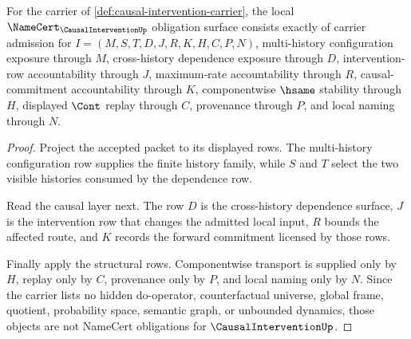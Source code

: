 \begin{theorem}
\label{thm:causal-intervention-namecert-obligations}
For the carrier of \autoref{def:causal-intervention-carrier}, the local $\NameCert_{\CausalInterventionUp}$ obligation surface consists exactly of carrier admission for $I=(M,S,T,D,J,R,K,H,C,P,N)$, multi-history configuration exposure through $M$, cross-history dependence exposure through $D$, intervention-row accountability through $J$, maximum-rate accountability through $R$, causal-commitment accountability through $K$, componentwise $\hsame$ stability through $H$, displayed $\Cont$ replay through $C$, provenance through $P$, and local naming through $N$.
\end{theorem}
\begin{proof}
Project the accepted packet to its displayed rows. The multi-history configuration row supplies the finite history family, while $S$ and $T$ select the two visible histories consumed by the dependence row.

Read the causal layer next. The row $D$ is the cross-history dependence surface, $J$ is the intervention row that changes the admitted local input, $R$ bounds the affected route, and $K$ records the forward commitment licensed by those rows.

Finally apply the structural rows. Componentwise transport is supplied only by $H$, replay only by $C$, provenance only by $P$, and local naming only by $N$. Since the carrier lists no hidden do-operator, counterfactual universe, global frame, quotient, probability space, semantic graph, or unbounded dynamics, those objects are not NameCert obligations for $\CausalInterventionUp$.
\end{proof}

